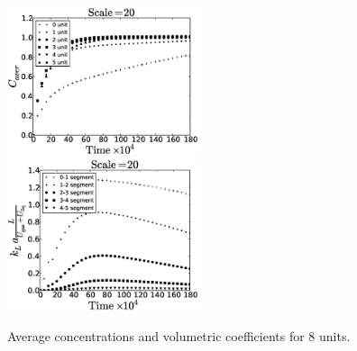\documentclass{article}
\begin{document}
\begin{figure}[htb!]
\includegraphics[width=0.5\textwidth]{Figures/aver_units6scale20.eps}\hfill
\includegraphics[width=0.5\textwidth]{Figures/coeff_units6scale20.eps}\\
\caption{Average concentrations and volumetric coefficients for $8$ units.
\label{fig:unit:10}}
\end{figure}
\end{document}
